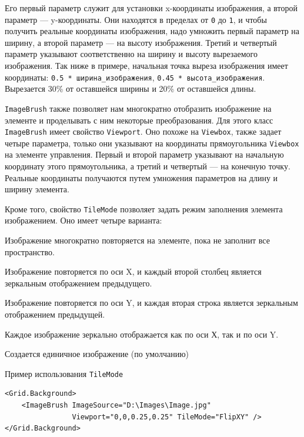 \begin{description}[style=nextline]
Его первый параметр служит для установки x-координаты изображения, а второй параметр — y-координаты. Они находятся в пределах от \texttt{0} до \texttt{1}, и чтобы получить реальные координаты изображения, надо умножить первый параметр на ширину, а второй параметр — на высоту изображения. Третий и четвертый параметр указывают соответственно на ширину и высоту вырезаемого изображения. Так ниже в примере, начальная точка выреза изображения имеет координаты: \texttt{0.5 * ширина_изображения}, \texttt{0.45 * высота_изображения}. Вырезается 30\% от оставшейся ширины и 20\% от оставшейся длины.

\texttt{ImageBrush} также позволяет нам многократно отобразить изображение на элементе и проделывать с ним некоторые преобразования. Для этого класс \texttt{ImageBrush} имеет свойство \texttt{Viewport}. Оно похоже на \texttt{Viewbox}, также задает четыре параметра, только они указывают на координаты прямоугольника \texttt{Viewbox} на элементе управления. Первый и второй параметр указывают на начальную координату этого прямоугольника, а третий и четвертый — на конечную точку. Реальные координаты получаются путем умножения параметров на длину и ширину элемента.

Кроме того, свойство \texttt{TileMode} позволяет задать режим заполнения элемента изображением. Оно имеет четыре варианта:

\begin{description}[style=nextline]
\item [\texttt{Tile}] Изображение многократно повторяется на элементе, пока не заполнит все пространство.
\item [\texttt{FlipX}] Изображение повторяется по оси X, и каждый второй столбец является зеркальным отображением предыдущего.
\item [\texttt{FlipY}] Изображение повторяется по оси Y, и каждая вторая строка является зеркальным отображением предыдущей.
\item [\texttt{FlipXY}] Каждое изображение зеркально отображается как по оси Х, так и по оси Y.
\item [\texttt{None}] Создается единичное изображение (по умолчанию)
\end{description}

Пример использования \texttt{TileMode}
\begin{verbatim}
<Grid.Background>
    <ImageBrush ImageSource="D:\Images\Image.jpg"
                Viewport="0,0,0.25,0.25" TileMode="FlipXY" />
</Grid.Background>
\end{verbatim}


\end{description}
